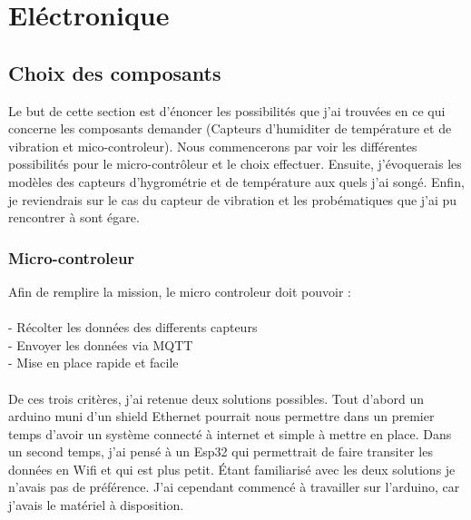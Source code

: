\documentclass[11pt,french,a4paper]{article}
\begin{document}


\newpage
\section{Eléctronique}
\subsection{Choix des composants}

Le but de cette section est d'énoncer les possibilités que j'ai trouvées en ce qui concerne les composants demander (Capteurs d'humiditer de température et de vibration et mico-controleur). Nous commencerons par voir les différentes possibilités pour le micro-contrôleur et le choix effectuer. Ensuite, j'évoquerais les modèles des capteurs d'hygrométrie et de température aux quels j'ai songé. Enfin, je reviendrais sur le cas du capteur de vibration et les probématiques que j'ai pu rencontrer à sont égare.

\subsubsection{Micro-controleur}

Afin de remplire la mission, le micro controleur doit pouvoir :\\
\\
	- Récolter les données des differents capteurs\\
	- Envoyer les données via MQTT\\
	- Mise en place rapide et facile\\
	\\
De ces trois critères, j'ai retenue deux solutions possibles. 
Tout d'abord un arduino muni d'un shield Ethernet pourrait nous permettre dans un premier temps d'avoir un système 
connecté à internet et simple à mettre en place.
Dans un second temps, j'ai pensé à un Esp32 qui permettrait de faire transiter les données en Wifi et qui est plus petit. 
Étant familiarisé avec les deux solutions je n'avais pas de préférence. J'ai cependant commencé à travailler sur l'arduino, car j'avais le matériel à disposition.
\end{document}
